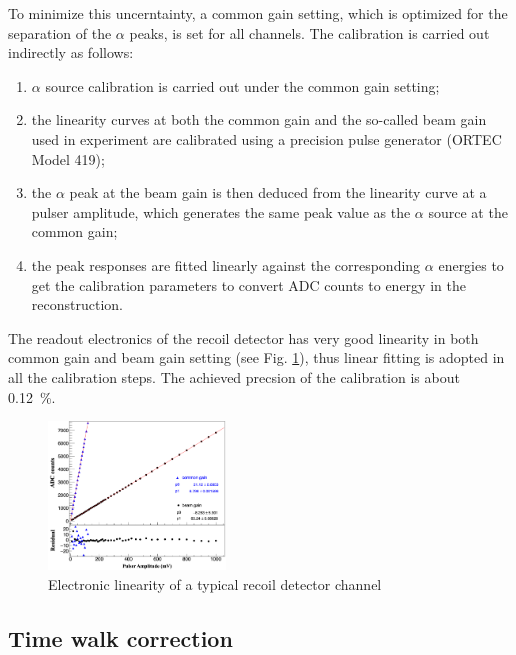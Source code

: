 \documentclass[number,5p]{elsarticle}
\begin{document}
To minimize this uncerntainty, a common gain setting, which is optimized for the separation of the \(\alpha\) peaks, is set for all channels.
The calibration is carried out indirectly as follows:
\begin{enumerate}
\item \(\alpha\) source calibration is carried out under the common gain setting;
\item the linearity curves at both the common gain and the so-called beam gain used
  in experiment are calibrated using a precision pulse generator (ORTEC Model 419);
\item the $\alpha$ peak at the beam gain is then deduced
  from the linearity curve at a pulser amplitude, which generates the same peak
  value as the $\alpha$ source at the common gain;
\item the peak responses are fitted linearly against the corresponding $\alpha$ energies
  to get the calibration parameters to convert ADC counts to energy in the reconstruction.
\end{enumerate}
The readout electronics of the recoil detector has very good linearity in both
common gain and beam gain setting (see Fig. \ref{fig:electronic_linearity}),
thus linear fitting is adopted in all the calibration steps.
The achieved precsion of the calibration is about \SI{0.12}{\percent}.
\begin{figure}[htb!]
  \centering
  \includegraphics[width=0.42\textwidth]{./linearity.png}
  \caption{Electronic linearity of a typical recoil detector channel}
  \label{fig:electronic_linearity}
\end{figure}

\subsection{Time walk correction}
\label{sec:timewalk}
\end{document}
